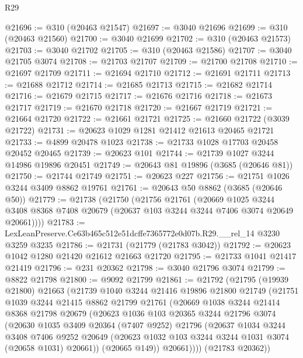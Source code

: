 \begin{lexlean}{R29}
\begin{coremodule}
@21696 := @310 (@20463 @21547)
@21697 := @3040 @21696
@21699 := @310 (@20463 @21560)
@21700 := @3040 @21699
@21702 := @310 (@20463 @21573)
@21703 := @3040 @21702
@21705 := @310 (@20463 @21586)
@21707 := @3040 @21705 @3074
@21708 := @21703 @21707
@21709 := @21700 @21708
@21710 := @21697 @21709
@21711 := @21694 @21710
@21712 := @21691 @21711
@21713 := @21688 @21712
@21714 := @21685 @21713
@21715 := @21682 @21714
@21716 := @21679 @21715
@21717 := @21676 @21716
@21718 := @21673 @21717
@21719 := @21670 @21718
@21720 := @21667 @21719
@21721 := @21664 @21720
@21722 := @21661 @21721
@21725 := @21660 @21722 (@3039 @21722)
@21731 := @20623 @1029 @1281 @21412 @21613 @20465 @21721
@21733 := @4899 @20478 @1023
@21738 := @21733 @1028 @17703 @20458 @20452 @20465
@21739 := @20623 @101
@21744 := @21739 @1027 @3244 @14986 @19896 @20451
@21749 := @20643 @81 @19896 (@3685 (@20646 @81))
@21750 := @21744 @21749
@21751 := @20623 @227
@21756 := @21751 @1026 @3244 @3409 @8862 @19761
@21761 := @20643 @50 @8862 (@3685 (@20646 @50))
@21779 := @21738
    (@21750
      (@21756
        @21761
        (@20669
          @1025
          @3244
          @3408
          @8368
          @7408
          @20679
          (@20637 @103 @3244 @3244 @7406 @3074 @20649 @20661))))
@21783 := LexLeanPreserve.Ce63b465c512e51dcffe7365772e0d07b.R29.__rel_14 @3230 @3259 @3235
@21786 := @21731 (@21779 (@21783 @3042))
@21792 := @20623 @1042 @1280 @21420 @21612 @21663 @21720
@21795 := @21733 @1041 @21417 @21419
@21796 := @231 @20362
@21798 := @3040 @21796 @3074
@21799 := @8822 @21798
@21800 := @9092 @21799
@21861 := @21792
    (@21795
      (@19939 @21800)
      @21663
      (@21739
        @1040
        @3244
        @21416
        @19896
        @21800
        @21749
        (@21751
          @1039
          @3244
          @21415
          @8862
          @21799
          @21761
          (@20669
            @1038
            @3244
            @21414
            @8368
            @21798
            @20679
            (@20623
              @1036
              @103
              @20365
              @3244
              @21796
              @3074
              (@20630
                @1035
                @3409
                @20364
                (@7407 @9252)
                @21796
                (@20637
                  @1034
                  @3244
                  @3408
                  @7406
                  @9252
                  @20649
                  (@20623 @1032 @103 @3244 @3244 @1031 @3074 (@20658 @1031) @20661))
                (@20665 @149))
              @20661))))
      (@21783 @20362))

\end{coremodule}
\end{lexlean}
